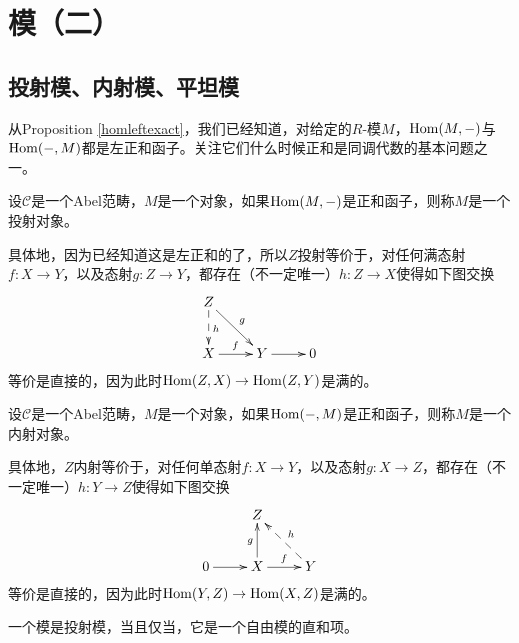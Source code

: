 \chapter{模（二）}

\section{投射模、内射模、平坦模}

从Proposition \ref{homleftexact}，我们已经知道，对给定的$R$-模$M$，$\operatorname{Hom}(M,-)$与$\operatorname{Hom}(-,M)$都是左正和函子。关注它们什么时候正和是同调代数的基本问题之一。

\begin{para}[投射对象]
	设$\mathcal C$是一个Abel范畴，$M$是一个对象，如果$\operatorname{Hom}(M,-)$是正和函子，则称$M$是一个投射对象。
\end{para}

具体地，因为已经知道这是左正和的了，所以$Z$投射等价于，对任何满态射$f:X\to Y$，以及态射$g:Z\to Y$，都存在（不一定唯一）$h:Z\to X$使得如下图交换
\[
	\xymatrix{
Z \ar@{->}[rd]^g \ar@{-->}[d]^h &  &  \\
X \ar@{->}[r]^f & Y \ar@{->}[r] & 0
}
\]
等价是直接的，因为此时$\operatorname{Hom}(Z,X)\to \operatorname{Hom}(Z,Y)$是满的。

\begin{para}[内射对象]
	设$\mathcal C$是一个Abel范畴，$M$是一个对象，如果$\operatorname{Hom}(-,M)$是正和函子，则称$M$是一个内射对象。
\end{para}

具体地，$Z$内射等价于，对任何单态射$f:X\to Y$，以及态射$g:X\to Z$，都存在（不一定唯一）$h:Y\to Z$使得如下图交换
\[
	\xymatrix{
 &  Z & \\
0 \ar@{->}[r] & X \ar@{->}[r]^f \ar[u]^g & Y \ar@{-->}[ul]_h
}
\]
等价是直接的，因为此时$\operatorname{Hom}(Y,Z)\to \operatorname{Hom}(X,Z)$是满的。

\begin{pro}
	一个模是投射模，当且仅当，它是一个自由模的直和项。
\end{pro}

